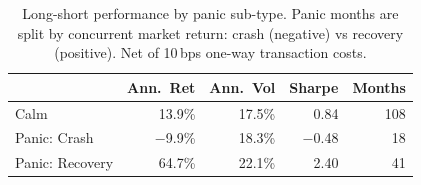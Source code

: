 \begin{table}[H]
\centering
\small
\begin{tabular}{l r r r r}
\toprule
 & Ann.\ Ret & Ann.\ Vol & Sharpe & Months \\
\midrule
Calm & 13.9\% & 17.5\% & 0.84 & 108 \\
Panic: Crash & $-$9.9\% & 18.3\% & $-$0.48 & 18 \\
Panic: Recovery & 64.7\% & 22.1\% & 2.40 & 41 \\
\bottomrule
\end{tabular}
\caption{Long-short performance by panic sub-type. Panic months are split by concurrent market return: crash (negative) vs recovery (positive). Net of 10\,bps one-way transaction costs.}
\label{tab:panic_subtypes}
\end{table}
